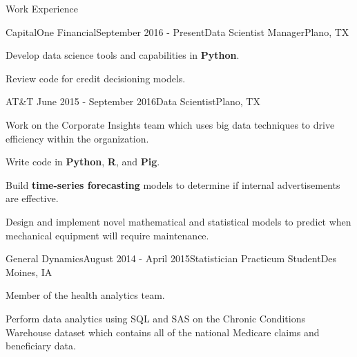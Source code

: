 \documentclass{resume} %
\begin{document}
\begin{rSection}{Work Experience}

\begin{rSubsection}{CapitalOne Financial}{September 2016 - Present}{Data Scientist Manager}{Plano, TX}
	\item Develop data science tools and capabilities in {\bf Python}.
	\item Review code for credit decisioning models.
\end{rSubsection}
	
\begin{rSubsection}{AT\&T }{June 2015 - September 2016}{Data Scientist}{Plano, TX}
	\item Work on the Corporate Insights team which uses big data techniques to drive efficiency within the organization.
	\item Write code in {\bf Python}, {\bf R}, and {\bf Pig}.
	\item Build {\bf time-series forecasting } models to determine if internal advertisements are effective.
	\item Design and implement novel mathematical and statistical models to predict when mechanical equipment will require maintenance.
\end{rSubsection}

\begin{rSubsection}{General Dynamics}{August 2014 - April 2015}{Statistician Practicum Student}{Des Moines, IA}
\item Member of the health analytics team.
\item Perform data analytics using SQL and SAS on the Chronic Conditions Warehouse dataset which contains all of the national Medicare claims and beneficiary data.
\end{rSubsection}




\end{rSection}
\end{document}
